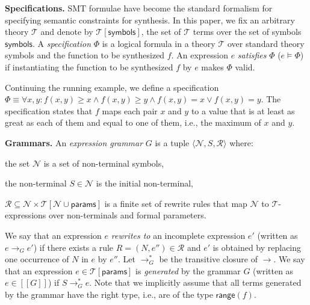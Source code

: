 \documentclass{llncs}
\newcommand\tuple[1]{\langle #1 \rangle}
\newcommand\Expr{e}
\newcommand\Spec{\Phi}
\newcommand\Grammar{G}
\newcommand\sem[1]{[\![ #1 ]\!]}
\newcommand\SynthFun{f}
\newcommand\range{\mathsf{range}}
\newcommand\FormalParameters{\mathsf{params}}
\newcommand\NonTerminals{\mathcal{N}}
\newcommand\NonTerminal{N}
\newcommand\StartSymbol{S}
\newcommand\Symbols{\mathsf{symbols}}
\newcommand\Rules{\mathcal{R}}
\newcommand\Rule{R}
\newcommand\Theory{\mathcal{T}}
\newcommand\RewritesTo{\rightarrow}
\renewcommand{\paragraph}[1]{\par\noindent\textbf{#1.}}
\begin{document}
\paragraph{Specifications}
SMT formulae have become the standard formalism
for specifying semantic constraints for synthesis.
In this paper, we fix an arbitrary theory $\Theory$ and
denote by $\Theory[\Symbols]$, the set of $\Theory$ terms over the
set of symbols $\Symbols$.
A {\em specification} $\Spec$ is a logical formula in a theory $\Theory$
over standard theory symbols and the function to be synthesized
$\SynthFun$.
An expression $\Expr$ {\em satisfies} $\Spec$ ($\Expr \models \Spec$) if
instantiating the function to be synthesized $\SynthFun$ by $\Expr$
makes $\Spec$ valid.

\begin{example}
  \label{ex:running:spec}
  Continuing the running example, we define a specification $\Spec
  \equiv \forall x, y : \SynthFun(x, y) \geq x \wedge \SynthFun(x, y)
  \geq y \wedge f(x, y) = x \vee f(x, y) = y$.
  The specification states that $\SynthFun$ maps each pair $x$ and $y$
  to a value that is at least as great as each of them and equal to one
  of them, i.e., the maximum of $x$ and $y$.
\end{example}

\paragraph{Grammars}
An {\em expression grammar} $\Grammar$ is a tuple $\tuple {
\NonTerminals, \StartSymbol, \Rules }$ where:
\begin{inparaenum}[(a)]
\item the set $\NonTerminals$ is a set of non-terminal symbols,
\item the non-terminal $\StartSymbol \in \NonTerminals$ is the initial non-terminal,
\item $\Rules \subseteq \NonTerminals \times
  \Theory[\NonTerminals \cup \FormalParameters]$ is a finite set
  of rewrite rules that map $\NonTerminals$ to $\Theory$-expressions
  over non-terminals and formal parameters.
\end{inparaenum}
We say that an expression $\Expr$ {\em rewrites to} an incomplete
expression $\Expr'$ (written as $\Expr \RewritesTo_\Grammar \Expr'$) if
there exists a rule $\Rule = (\NonTerminal, \Expr'') \in \Rules$ and
$\Expr'$ is obtained by replacing one occurrence of $\NonTerminal$ in
$\Expr$ by $\Expr''$.
Let $\RewritesTo_\Grammar^*$ be the transitive closure of $\RewritesTo$.
We say that an expression $\Expr \in \Theory[\FormalParameters]$
is {\em generated} by the grammar $\Grammar$ (written as $\Expr \in
\sem{\Grammar}$) if $\StartSymbol \RewritesTo_\Grammar^* \Expr$.
Note that we implicitly assume that all terms generated by the grammar
have the right type, i.e., are of the type $\range(\SynthFun)$.
\end{document}
